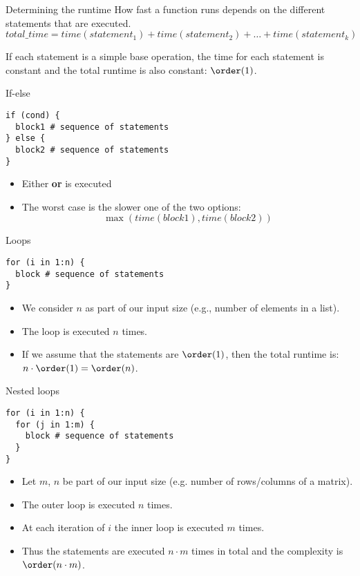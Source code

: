 \documentclass[11pt,compress,t,notes=noshow, xcolor=table]{beamer}
\begin{document}
\begin{vbframe}{Determining the runtime}
How fast a function runs depends on the different statements that are executed.
$$
total\_time = time(statement_1) + time(statement_2) + \ldots + time(statement_k)
$$

If each statement is a simple base operation, the time for each
statement is constant and the total runtime is also constant: $\order(1)$.

\framebreak

\begin{block}{If-else}
\begin{verbatim}
if (cond) {
  block1 # sequence of statements
} else {
  block2 # sequence of statements
}
\end{verbatim}

\begin{itemize}
  \item Either  \textbf{or}  is executed
  \item The worst case is the slower one of the two options:
  $$
  \max(time(block1), time(block2))
  $$
\end{itemize}
\end{block}

\framebreak

\begin{block}{Loops}
\begin{verbatim}
for (i in 1:n) {
  block # sequence of statements
}
\end{verbatim}

\begin{itemize}
  \item We consider $n$ as part of our input size (e.g., number of elements in a list).
  \item The loop is executed $n$ times.
  \item If we assume that the statements are $\order(1)$, then the total runtime is: $n \cdot \order(1) = \order(n)$.
\end{itemize}
\end{block}

\framebreak

\begin{block}{Nested loops}
\begin{verbatim}
for (i in 1:n) {
  for (j in 1:m) {
    block # sequence of statements
  }
}
\end{verbatim}

\begin{itemize}
  \item Let $m$, $n$ be part of our input size (e.g. number of rows/columns of a matrix).
  \item The outer loop is executed $n$ times.
  \item At each iteration of $i$ the inner loop is executed $m$ times.
  \item Thus the statements are executed $n \cdot m$ times in total and the complexity is $\order(n \cdot m)$.
\end{itemize}
\end{block}


\end{vbframe}
\end{document}
